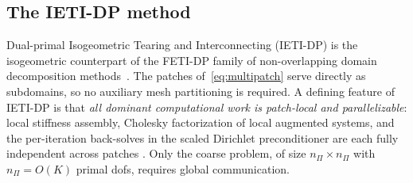 \documentclass{article}
\newcommand{\nprim}{n_\Pi}                        %
\theoremstyle{plain}
\numberwithin{equation}{section}
\begin{document}
\subsection{The IETI-DP method} \label{subsec:ieti}

Dual-primal Isogeometric Tearing and Interconnecting (IETI-DP) is the
isogeometric counterpart of the FETI-DP family of non-overlapping domain
decomposition methods~\cite{farhat1991method, toselli2004domain}.
The patches of~\eqref{eq:multipatch} serve directly as subdomains, so no
auxiliary mesh partitioning is required.
A defining feature of IETI-DP is that \emph{all dominant computational
    work is patch-local and parallelizable}: local stiffness assembly,
Cholesky factorization of local augmented systems, and the per-iteration
back-solves in the scaled Dirichlet preconditioner are each fully independent
across patches \cite{kleiss2012ieti}. Only the coarse problem, of size $\nprim \times \nprim$ with $\nprim = O(K)$
primal dofs, requires global communication.
\end{document}
